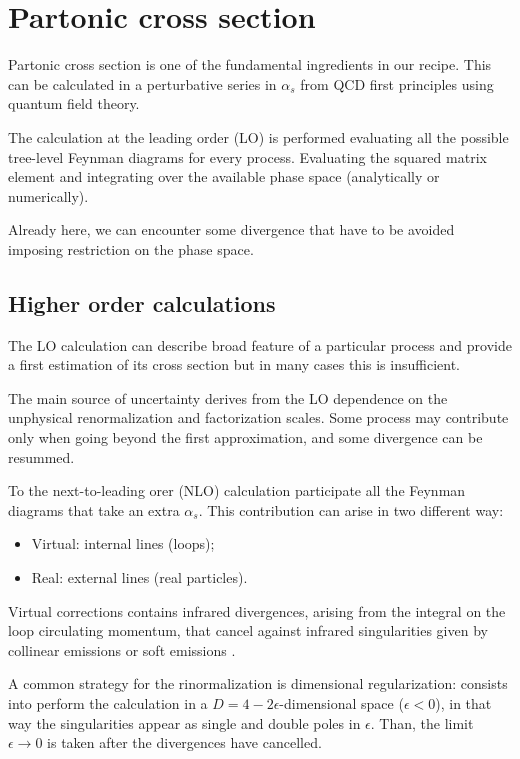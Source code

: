 \section{Partonic cross section}

Partonic cross section is one of the fundamental ingredients in our recipe. This can be calculated in a perturbative series in $\alpha_s$ from QCD first principles using quantum field theory.

The calculation at the leading order (LO) is performed evaluating all the possible tree-level Feynman diagrams for every process. Evaluating the squared matrix element and integrating over the available phase space (analytically or numerically).

Already here, we can encounter some divergence that have to be avoided imposing restriction on the phase space.

\subsection{Higher order calculations}

The LO calculation can describe broad feature of a particular process and provide a first estimation of its cross section but in many cases this is insufficient.

The main source of uncertainty derives from the LO dependence  on the unphysical renormalization and factorization scales. Some process may contribute only when going beyond the first approximation, and some divergence can be resummed. 

To the next-to-leading orer (NLO) calculation participate all the Feynman diagrams that take an extra $\alpha_s$. This contribution can arise in two different way:
\begin{itemize}
	\item Virtual: internal lines (loops);
	\item Real: external lines (real particles).
\end{itemize}

Virtual corrections contains infrared divergences, arising from the integral on the loop circulating momentum, that cancel against infrared singularities given by collinear emissions or soft emissions \cite{PhysRevBloch, KinoshitaToichiro, PhysRevLee}. 

A common strategy for the rinormalization is dimensional regularization: consists into perform the calculation in a $D=4-2\epsilon$-dimensional space ($\epsilon<0$), in that way the singularities appear as single and double poles in $\epsilon$. Than, the limit $\epsilon\rightarrow0$ is taken after the divergences have cancelled.

